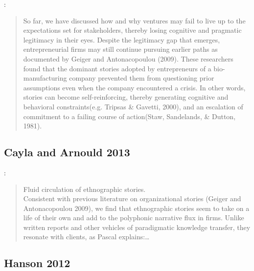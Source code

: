 \cite[p.17]{garud2014entrepreneurial}:
\begin{quote}
So  far,  we  have  discussed  how  and  why  ventures  may  fail  to  live  up  to  the  expectations  set  for stakeholders, thereby losing cognitive and pragmatic legitimacy in their eyes. Despite the legitimacy gap that emerges, entrepreneurial firms may still continue pursuing earlier paths as documented by Geiger and Antonacopoulou (2009). These researchers found that the dominant stories adopted by entrepreneurs of a bio-manufacturing company prevented them from questioning prior assumptions even when the company encountered a crisis. In other words, stories can become self-reinforcing, thereby generating cognitive and behavioral constraints(e.g. Tripsas \& Gavetti, 2000), and an escalation of commitment to a failing course of action(Staw, Sandelands, \& Dutton, 1981).
\begin{flushright}
\end{flushright}
\end{quote}

\subsection{Cayla and Arnould 2013}

\cite{cayla2013ethnographic}:
\begin{quote}
Fluid circulation of ethnographic stories.\\
Consistent with previous literature on organizational stories (Geiger and Antonacopoulou 2009), we find that ethnographic stories seem to take on a life of their own and add to the polyphonic narrative   flux   in   firms.   Unlike   written   reports   and   other vehicles of paradigmatic knowledge transfer, they resonate with clients, as Pascal explains:\ldots
\end{quote}

\subsection{Hanson 2012}

